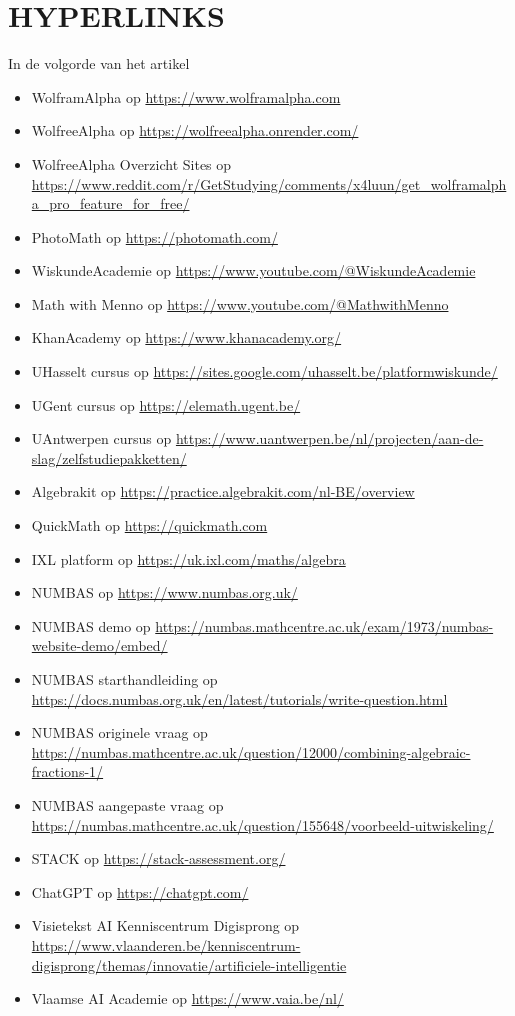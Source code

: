 \section*{HYPERLINKS}
In de volgorde van het artikel
\begin{itemize}[label={},leftmargin=20pt,itemindent=-20pt,itemsep=6pt,parsep=0pt]%
\item WolframAlpha op \url{https://www.wolframalpha.com}
\item WolfreeAlpha op \url{https://wolfreealpha.onrender.com/}
\item WolfreeAlpha Overzicht Sites op \url{https://www.reddit.com/r/GetStudying/comments/x4luun/get_wolframalpha_pro_feature_for_free/}
\item PhotoMath op \url{https://photomath.com/}
\item WiskundeAcademie op \url{https://www.youtube.com/@WiskundeAcademie}
\item Math with Menno op \url{https://www.youtube.com/@MathwithMenno}
\item KhanAcademy op \url{https://www.khanacademy.org/} 
\item UHasselt cursus op \url{https://sites.google.com/uhasselt.be/platformwiskunde/}
\item UGent cursus op \url{https://elemath.ugent.be/}
\item UAntwerpen cursus op \url{https://www.uantwerpen.be/nl/projecten/aan-de-slag/zelfstudiepakketten/}
\item Algebrakit op \url{https://practice.algebrakit.com/nl-BE/overview}
\item QuickMath op \url{https://quickmath.com}
\item IXL platform op \url{https://uk.ixl.com/maths/algebra}
\item NUMBAS op \url{https://www.numbas.org.uk/}
\item NUMBAS demo op \url{https://numbas.mathcentre.ac.uk/exam/1973/numbas-website-demo/embed/}
\item NUMBAS starthandleiding op \url{https://docs.numbas.org.uk/en/latest/tutorials/write-question.html}
\item NUMBAS originele vraag op \url{https://numbas.mathcentre.ac.uk/question/12000/combining-algebraic-fractions-1/}
\item NUMBAS aangepaste vraag op \url{https://numbas.mathcentre.ac.uk/question/155648/voorbeeld-uitwiskeling/}
\item STACK op \url{https://stack-assessment.org/}
\item ChatGPT op \url{https://chatgpt.com/}
\item Visietekst AI Kenniscentrum Digisprong op \url{https://www.vlaanderen.be/kenniscentrum-digisprong/themas/innovatie/artificiele-intelligentie}
\item Vlaamse AI Academie op \url{https://www.vaia.be/nl/}
\end{itemize}